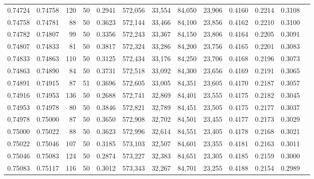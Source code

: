 \begin{tabular}{rrrrrrrrrrrrr}
0.74724 & 0.74758 &   120 &  50 &                                     0.2941 & 572,056 &  33,554 &  84,050 &  23,906 & 0.4160 & 0.2214 & 0.3108 \\
0.74758 & 0.74781 &    88 &  50 &                                     0.3623 & 572,144 &  33,466 &  84,100 &  23,856 & 0.4162 & 0.2210 & 0.3100 \\
0.74782 & 0.74807 &    99 &  50 &                                     0.3356 & 572,243 &  33,367 &  84,150 &  23,806 & 0.4164 & 0.2205 & 0.3091 \\
0.74807 & 0.74833 &    81 &  50 &                                     0.3817 & 572,324 &  33,286 &  84,200 &  23,756 & 0.4165 & 0.2201 & 0.3083 \\
0.74833 & 0.74863 &   110 &  50 &                                     0.3125 & 572,434 &  33,176 &  84,250 &  23,706 & 0.4168 & 0.2196 & 0.3073 \\
0.74863 & 0.74890 &    84 &  50 &                                     0.3731 & 572,518 &  33,092 &  84,300 &  23,656 & 0.4169 & 0.2191 & 0.3065 \\
0.74891 & 0.74915 &    87 &  51 &                                     0.3696 & 572,605 &  33,005 &  84,351 &  23,605 & 0.4170 & 0.2187 & 0.3057 \\
0.74916 & 0.74953 &   136 &  50 &                                     0.2688 & 572,741 &  32,869 &  84,401 &  23,555 & 0.4175 & 0.2182 & 0.3045 \\
0.74953 & 0.74978 &    80 &  50 &                                     0.3846 & 572,821 &  32,789 &  84,451 &  23,505 & 0.4175 & 0.2177 & 0.3037 \\
0.74978 & 0.75000 &    87 &  50 &                                     0.3650 & 572,908 &  32,702 &  84,501 &  23,455 & 0.4177 & 0.2173 & 0.3029 \\
0.75000 & 0.75022 &    88 &  50 &                                     0.3623 & 572,996 &  32,614 &  84,551 &  23,405 & 0.4178 & 0.2168 & 0.3021 \\
0.75022 & 0.75046 &   107 &  50 &                                     0.3185 & 573,103 &  32,507 &  84,601 &  23,355 & 0.4181 & 0.2163 & 0.3011 \\
0.75046 & 0.75083 &   124 &  50 &                                     0.2874 & 573,227 &  32,383 &  84,651 &  23,305 & 0.4185 & 0.2159 & 0.3000 \\
0.75083 & 0.75117 &   116 &  50 &                                     0.3012 & 573,343 &  32,267 &  84,701 &  23,255 & 0.4188 & 0.2154 & 0.2989 \\

\end{tabular}
